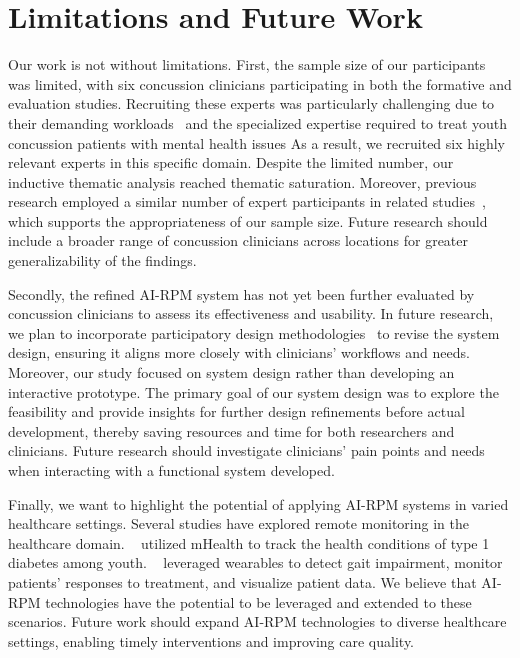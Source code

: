 
\section{Limitations and Future Work}
Our work is not without limitations. 
First, the sample size of our participants was limited, with six concussion clinicians participating in both the formative and evaluation studies.
Recruiting these experts was particularly challenging due to their demanding workloads~\cite{wang2021brilliant,jin2020carepre} and the specialized expertise required to treat youth concussion patients with mental health issues
As a result, we recruited six highly relevant experts in this specific domain. 
Despite the limited number, our inductive thematic analysis reached thematic saturation.
Moreover, previous research employed a similar number of expert participants in related studies~\cite{cai2019hello,beede2020human,jacobs2021designing,yang2024talk2care,zhang2024rethinking}, which supports the appropriateness of our sample size. 
Future research should include a broader range of concussion clinicians across locations for greater generalizability of the findings. 

Secondly, the refined AI-RPM system has not yet been further evaluated by concussion clinicians to assess its effectiveness and usability. 
In future research, we plan to incorporate participatory design methodologies~\cite{muller1993participatory} to revise the system design, ensuring it aligns more closely with clinicians' workflows and needs. 
Moreover, our study focused on system design rather than developing an interactive prototype. The primary goal of our system design was to explore the feasibility and provide insights for further design refinements before actual development, thereby saving resources and time for both researchers and clinicians. 
Future research should investigate clinicians' pain points and needs when interacting with a functional system developed. 


Finally, we want to highlight the potential of applying AI-RPM systems in varied healthcare settings. %
Several studies have explored remote monitoring in the healthcare domain. 
~\citet{wyche2024limitations} utilized mHealth to track the health conditions of type 1 diabetes among youth. 
~\citet{seals2022they} leveraged wearables to detect gait impairment, monitor patients' responses to treatment, and visualize patient data.
We believe that AI-RPM technologies have the potential to be leveraged and extended to these scenarios.
Future work should expand AI-RPM technologies to diverse healthcare settings, enabling timely interventions and improving care quality.



